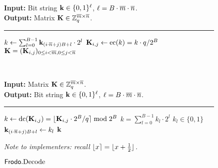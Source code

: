 \begin{figure}[h!]
\centering
\begin{minipage}[t]{0.48\textwidth}
\begin{algorithm}[H]
\caption{\label{alg:encode} $\Frodo.\Encode$}
{\bf Input:} Bit string $\mathbf{k}\in \{0,1\}^\ell$, $\ell = B\cdot\overline{m}\cdot\overline{n}$.\\
{\bf Output:} Matrix $\mathbf{K} \in \mathbb{Z}_q^{\overline{m} \times \overline{n}}$.\\[-1.5ex]
\rule{\linewidth}{.5pt}
\vspace{-0.5cm}
\begin{algorithmic}[1]
    \STATE $k \gets \sum_{l=0}^{B-1}\mathbf{k}_{(i\cdot \overline{n} + j)B+l}\cdot 2^l$
    \STATE $\mathbf{K}_{i,j} \gets \textrm{\upshape\mdseries ec}(k)= k\cdot q/2^B$
    \ENDFOR
    \ENDFOR
    \RETURN$\mathbf{K} = (\mathbf{K}_{i,j})_{0\leq i < \overline{m}, 0 \leq j < \overline{n}}$
\end{algorithmic}
\end{algorithm}
\end{minipage}
~
\begin{minipage}[t]{0.49\textwidth}
\begin{algorithm}[H]
\caption{\label{alg:decode} $\textsf{\upshape\mdseries Frodo}.\textrm{\upshape\mdseries Decode}$}
{\bf Input:} Matrix $\mathbf{K} \in \mathbb{Z}_q^{\overline{m}\times\overline{n}}$.\\
{\bf Output:} Bit string $\mathbf{k} \in \{0,1\}^\ell$, $\ell = B\cdot\overline{m}\cdot\overline{n}$.\\[-1.5ex]
\rule{\linewidth}{.5pt}
\vspace{-0.5cm}
\begin{algorithmic}[1]
    \STATE $k \gets \textrm{\upshape\mdseries dc}(\mathbf{K}_{i,j})= \lfloor\mathbf{K}_{i,j}\cdot 2^B/q\rceil \bmod 2^B$
    \STATE $k = \sum_{l=0}^{B-1}k_l \cdot 2^l$  $k_l\in \{0,1\}$
    \STATE $\mathbf{k}_{(i\cdot \overline{n} + j)B+l} \gets k_l$ 
    \ENDFOR
    \ENDFOR
    \ENDFOR
    \RETURN$\mathbf{k}$
\end{algorithmic}
\end{algorithm}
\vspace{-0.5em}
\textit{Note to implementers: recall $\lfloor x\rceil = \lfloor x + \frac{1}{2} \rfloor$.}
\end{minipage}
\end{figure}

